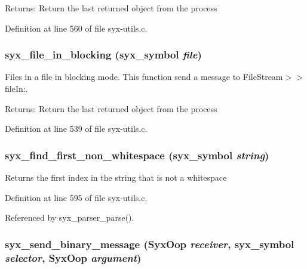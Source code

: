 \begin{Desc}
\item[Returns:]Return the last returned object from the process \end{Desc}


Definition at line 560 of file syx-utils.c.\hypertarget{syx-utils_8c_1300f846803090b4be8b089229ec79ec}{
\subsubsection{ syx\_\-file\_\-in\_\-blocking ({\bf syx\_\-symbol} {\em file})}}
\label{syx-utils_8c_1300f846803090b4be8b089229ec79ec}


Files in a file in blocking mode. This function send a message to FileStream$>$$>$fileIn:.

\begin{Desc}
\item[Returns:]Return the last returned object from the process \end{Desc}


Definition at line 539 of file syx-utils.c.\hypertarget{syx-utils_8c_1835c001226820fab823c5966ed8f9ac}{
\subsubsection{ syx\_\-find\_\-first\_\-non\_\-whitespace ({\bf syx\_\-symbol} {\em string})}}
\label{syx-utils_8c_1835c001226820fab823c5966ed8f9ac}


Returns the first index in the string that is not a whitespace 

Definition at line 595 of file syx-utils.c.

Referenced by syx\_\-parser\_\-parse().\hypertarget{syx-utils_8c_48a0ba618561692f6c1858fcbc5d63f6}{
\subsubsection{ syx\_\-send\_\-binary\_\-message ({\bf SyxOop} {\em receiver}, \/  {\bf syx\_\-symbol} {\em selector}, \/  {\bf SyxOop} {\em argument})}}
\label{syx-utils_8c_48a0ba618561692f6c1858fcbc5d63f6}


